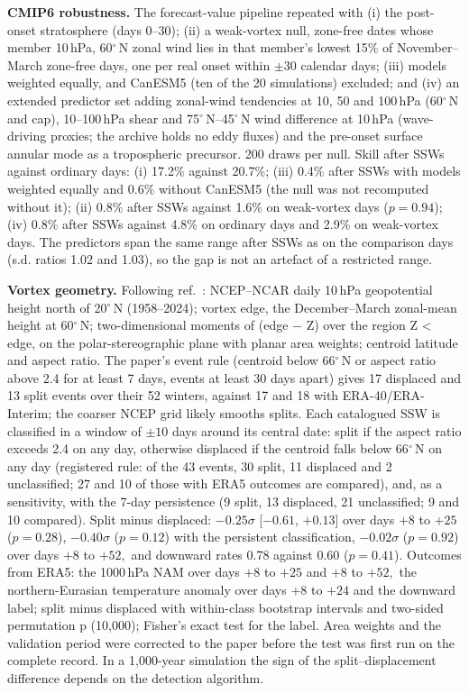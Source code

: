 \documentclass[11pt]{article}
\begin{document}
\textbf{CMIP6 robustness.} The forecast-value pipeline repeated with (i) the post-onset stratosphere (days 0–30); (ii) a weak-vortex null, zone-free dates whose member 10\,hPa, 60$^\circ$\,N zonal wind lies in that member's lowest 15\% of November–March zone-free days, one per real onset within $\pm30$ calendar days; (iii) models weighted equally, and CanESM5 (ten of the 20 simulations) excluded; and (iv) an extended predictor set adding zonal-wind tendencies at 10, 50 and 100\,hPa (60$^\circ$\,N and cap), 10–100\,hPa shear and 75$^\circ$\,N–45$^\circ$\,N wind difference at 10\,hPa (wave-driving proxies; the archive holds no eddy fluxes) and the pre-onset surface annular mode as a tropospheric precursor. 200 draws per null. Skill after SSWs against ordinary days: (i) 17.2\% against 20.7\%; (iii) 0.4\% after SSWs with models weighted equally and 0.6\% without CanESM5 (the null was not recomputed without it); (ii) 0.8\% after SSWs against 1.6\% on weak-vortex days ($p = 0.94$); (iv) 0.8\% after SSWs against 4.8\% on ordinary days and 2.9\% on weak-vortex days. The predictors span the same range after SSWs as on the comparison days (s.d. ratios 1.02 and 1.03), so the gap is not an artefact of a restricted range.

\textbf{Vortex geometry.} Following ref.~\cite{seviour13}: NCEP–NCAR daily 10\,hPa geopotential height north of 20$^\circ$\,N (1958–2024); vortex edge, the December–March zonal-mean height at 60$^\circ$\,N; two-dimensional moments of (edge $-$ Z) over the region Z < edge, on the polar-stereographic plane with planar area weights; centroid latitude and aspect ratio. The paper's event rule (centroid below 66$^\circ$\,N or aspect ratio above 2.4 for at least 7 days, events at least 30 days apart) gives 17 displaced and 13 split events over their 52 winters, against 17 and 18 with ERA-40/ERA-Interim; the coarser NCEP grid likely smooths splits. Each catalogued SSW is classified in a window of $\pm10$ days around its central date: split if the aspect ratio exceeds 2.4 on any day, otherwise displaced if the centroid falls below 66$^\circ$\,N on any day (registered rule: of the 43 events, 30 split, 11 displaced and 2 unclassified; 27 and 10 of those with ERA5 outcomes are compared), and, as a sensitivity, with the 7-day persistence (9 split, 13 displaced, 21 unclassified; 9 and 10 compared). Split minus displaced: $-0.25\sigma$ [$-0.61$, $+0.13$] over days $+8$ to $+25$ ($p = 0.28$), $-0.40\sigma$ ($p = 0.12$) with the persistent classification, $-0.02\sigma$ ($p = 0.92$) over days $+8$ to $+52{,}$ and downward rates 0.78 against 0.60 ($p = 0.41$). Outcomes from ERA5: the 1000\,hPa NAM over days $+8$ to $+25$ and $+8$ to $+52{,}$ the northern-Eurasian temperature anomaly over days $+8$ to $+24$ and the downward label; split minus displaced with within-class bootstrap intervals and two-sided permutation p (10,000); Fisher's exact test for the label. Area weights and the validation period were corrected to the paper before the test was first run on the complete record. In a 1,000-year simulation the sign of the split–displacement difference depends on the detection algorithm\cite{maycock15}.
\end{document}

